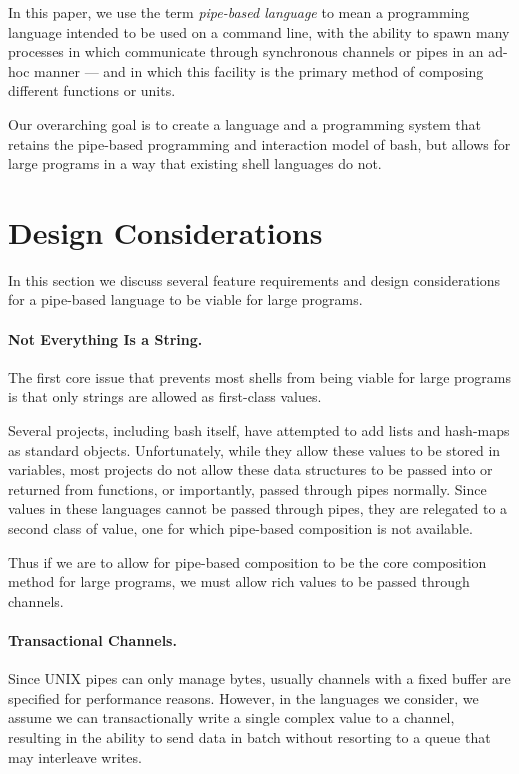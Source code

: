 \documentclass[format=sigconf, review=true, draft=true, screen=true]{acmart}
\begin{document}
In this paper, we use the term \emph{pipe-based language} to mean a programming language intended to be used on a command line, with the ability to spawn many processes in which communicate through synchronous channels or pipes in an ad-hoc manner --- and in which this facility is the primary method of composing different functions or units.


Our overarching goal is to create a language and a programming system that retains the pipe-based programming and interaction model of bash, but allows for large programs in a way that existing shell languages do not.

\section{Design Considerations}
In this section we discuss several feature requirements and design considerations for a pipe-based language to be viable for large programs.

\paragraph{Not Everything Is a String.}
The first core issue that prevents most shells from being viable for large programs is that only strings are allowed as first-class values.

Several projects\cite{haahr}\cite{duff}, including bash itself, have attempted to add lists and hash-maps as standard objects. Unfortunately, while they allow these values to be stored in variables, most projects do not allow these data structures to be passed into or returned from functions, or importantly, passed through pipes normally.
Since values in these languages cannot be passed through pipes, they are relegated to a second class of value, one for which pipe-based composition is not available.

Thus if we are to allow for pipe-based composition to be the core composition method for large programs, we must allow rich values to be passed through channels.

\paragraph{Transactional Channels.}
Since UNIX pipes can only manage bytes, usually channels with a fixed buffer are specified for performance reasons. However, in the languages we consider, we assume we can transactionally write a single complex value to a channel, resulting in the ability to send data in batch without resorting to a queue that may interleave writes.
\end{document}
